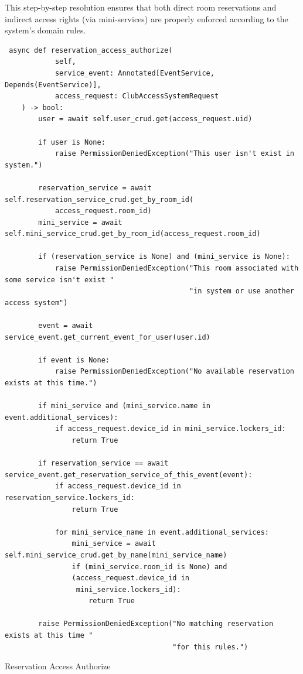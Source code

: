 This step-by-step resolution ensures that both direct room reservations and indirect access rights (via mini-services) are properly enforced according to the system's domain rules.

\begin{listing}
  \begin{verbatim}
 async def reservation_access_authorize(
            self,
            service_event: Annotated[EventService, Depends(EventService)],
            access_request: ClubAccessSystemRequest
    ) -> bool:
        user = await self.user_crud.get(access_request.uid)

        if user is None:
            raise PermissionDeniedException("This user isn't exist in system.")

        reservation_service = await self.reservation_service_crud.get_by_room_id(
            access_request.room_id)
        mini_service = await self.mini_service_crud.get_by_room_id(access_request.room_id)

        if (reservation_service is None) and (mini_service is None):
            raise PermissionDeniedException("This room associated with some service isn't exist "
                                            "in system or use another access system")

        event = await service_event.get_current_event_for_user(user.id)

        if event is None:
            raise PermissionDeniedException("No available reservation exists at this time.")

        if mini_service and (mini_service.name in event.additional_services):
            if access_request.device_id in mini_service.lockers_id:
                return True

        if reservation_service == await service_event.get_reservation_service_of_this_event(event):
            if access_request.device_id in reservation_service.lockers_id:
                return True

            for mini_service_name in event.additional_services:
                mini_service = await self.mini_service_crud.get_by_name(mini_service_name)
                if (mini_service.room_id is None) and 
                (access_request.device_id in
                 mini_service.lockers_id):
                    return True

        raise PermissionDeniedException("No matching reservation exists at this time "
                                        "for this rules.")
\end{verbatim}
\caption{Reservation Access Authorize}
\label{list:reservation-access-authorize}
\end{listing}

